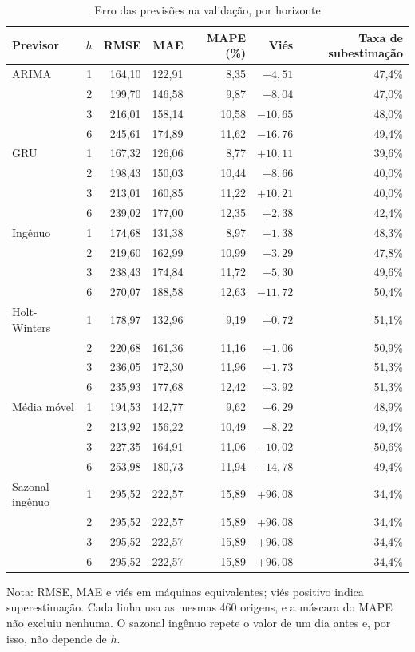 \begin{table}[htbp]
\centering
\caption{Erro das previsões na validação, por horizonte}
\label{tab:erro-horizonte-val}
\footnotesize
\begin{tabular}{lcrrrrr}
\toprule
\textbf{Previsor} & $h$ & \textbf{RMSE} & \textbf{MAE} & \textbf{MAPE (\%)} & \textbf{Viés} & \textbf{Taxa de subestimação} \\
\midrule
ARIMA & 1 & 164,10 & 122,91 & 8,35 & $-4{,}51$ & 47,4\% \\
 & 2 & 199,70 & 146,58 & 9,87 & $-8{,}04$ & 47,0\% \\
 & 3 & 216,01 & 158,14 & 10,58 & $-10{,}65$ & 48,0\% \\
 & 6 & 245,61 & 174,89 & 11,62 & $-16{,}76$ & 49,4\% \\
\addlinespace
GRU & 1 & 167,32 & 126,06 & 8,77 & $+10{,}11$ & 39,6\% \\
 & 2 & 198,43 & 150,03 & 10,44 & $+8{,}66$ & 40,0\% \\
 & 3 & 213,01 & 160,85 & 11,22 & $+10{,}21$ & 40,0\% \\
 & 6 & 239,02 & 177,00 & 12,35 & $+2{,}38$ & 42,4\% \\
\addlinespace
Ingênuo & 1 & 174,68 & 131,38 & 8,97 & $-1{,}38$ & 48,3\% \\
 & 2 & 219,60 & 162,99 & 10,99 & $-3{,}29$ & 47,8\% \\
 & 3 & 238,43 & 174,84 & 11,72 & $-5{,}30$ & 49,6\% \\
 & 6 & 270,07 & 188,58 & 12,63 & $-11{,}72$ & 50,4\% \\
\addlinespace
Holt-Winters & 1 & 178,97 & 132,96 & 9,19 & $+0{,}72$ & 51,1\% \\
 & 2 & 220,68 & 161,36 & 11,16 & $+1{,}06$ & 50,9\% \\
 & 3 & 236,05 & 172,30 & 11,96 & $+1{,}73$ & 51,3\% \\
 & 6 & 235,93 & 177,68 & 12,42 & $+3{,}92$ & 51,3\% \\
\addlinespace
Média móvel & 1 & 194,53 & 142,77 & 9,62 & $-6{,}29$ & 48,9\% \\
 & 2 & 213,92 & 156,22 & 10,49 & $-8{,}22$ & 49,4\% \\
 & 3 & 227,35 & 164,91 & 11,06 & $-10{,}02$ & 50,6\% \\
 & 6 & 253,98 & 180,73 & 11,94 & $-14{,}78$ & 49,4\% \\
\addlinespace
Sazonal ingênuo & 1 & 295,52 & 222,57 & 15,89 & $+96{,}08$ & 34,4\% \\
 & 2 & 295,52 & 222,57 & 15,89 & $+96{,}08$ & 34,4\% \\
 & 3 & 295,52 & 222,57 & 15,89 & $+96{,}08$ & 34,4\% \\
 & 6 & 295,52 & 222,57 & 15,89 & $+96{,}08$ & 34,4\% \\
\bottomrule
\end{tabular}

\smallskip
\parbox{\textwidth}{\footnotesize Nota: RMSE, MAE e viés em máquinas equivalentes; viés positivo indica superestimação. Cada linha usa as mesmas 460 origens, e a máscara do MAPE não excluiu nenhuma. O sazonal ingênuo repete o valor de um dia antes e, por isso, não depende de $h$.}
\end{table}

